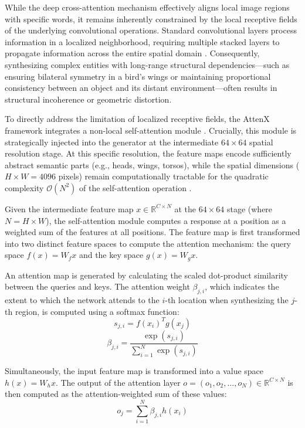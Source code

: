 \documentclass[conference]{IEEEtran}
\begin{document}
While the deep cross-attention mechanism effectively aligns local image regions with specific words, it remains inherently constrained by the local receptive fields of the underlying convolutional operations. Standard convolutional layers process information in a localized neighborhood, requiring multiple stacked layers to propagate information across the entire spatial domain \cite{wang2018nonlocal}. Consequently, synthesizing complex entities with long-range structural dependencies---such as ensuring bilateral symmetry in a bird's wings or maintaining proportional consistency between an object and its distant environment---often results in structural incoherence or geometric distortion.

To directly address the limitation of localized receptive fields, the AttenX framework integrates a non-local self-attention module \cite{wang2018nonlocal, zhang2019selfattention}. Crucially, this module is strategically injected into the generator at the intermediate $64 \times 64$ spatial resolution stage. At this specific resolution, the feature maps encode sufficiently abstract semantic parts (e.g., heads, wings, torsos), while the spatial dimensions ($H \times W = 4096$ pixels) remain computationally tractable for the quadratic complexity $\mathcal{O}(N^2)$ of the self-attention operation \cite{vaswani2017attention}.

Given the intermediate feature map $x \in \mathbb{R}^{C \times N}$ at the $64 \times 64$ stage (where $N = H \times W$), the self-attention module computes a response at a position as a weighted sum of the features at all positions. The feature map is first transformed into two distinct feature spaces to compute the attention mechanism: the query space $f(x) = W_f x$ and the key space $g(x) = W_g x$.

An attention map is generated by calculating the scaled dot-product similarity between the queries and keys. The attention weight $\beta_{j,i}$, which indicates the extent to which the network attends to the $i$-th location when synthesizing the $j$-th region, is computed using a softmax function:
\begin{equation}
    s_{j,i} = f(x_i)^T g(x_j)
\end{equation}
\begin{equation}
    \beta_{j,i} = \frac{\exp(s_{j,i})}{\sum_{i=1}^{N} \exp(s_{j,i})}
\end{equation}

Simultaneously, the input feature map is transformed into a value space $h(x) = W_h x$. The output of the attention layer $o = (o_1, o_2, \dots, o_N) \in \mathbb{R}^{C \times N}$ is then computed as the attention-weighted sum of these values:
\begin{equation}
    o_j = \sum_{i=1}^{N} \beta_{j,i} h(x_i)
\end{equation}
\end{document}
